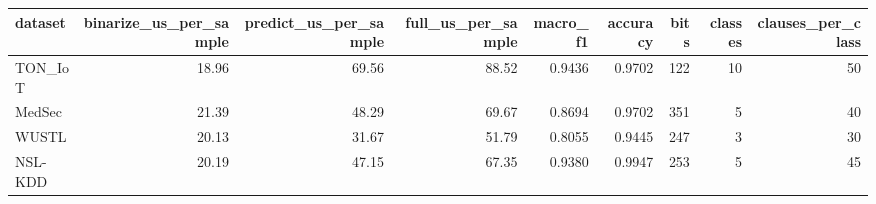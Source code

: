 \begin{tabular}{lrrrrrrrr}
\toprule
dataset & binarize\_us\_per\_sample & predict\_us\_per\_sample & full\_us\_per\_sample & macro\_f1 & accuracy & bits & classes & clauses\_per\_class \\
\midrule
TON\_IoT & 18.96 & 69.56 & 88.52 & 0.9436 & 0.9702 & 122 & 10 & 50 \\
MedSec & 21.39 & 48.29 & 69.67 & 0.8694 & 0.9702 & 351 & 5 & 40 \\
WUSTL & 20.13 & 31.67 & 51.79 & 0.8055 & 0.9445 & 247 & 3 & 30 \\
NSL-KDD & 20.19 & 47.15 & 67.35 & 0.9380 & 0.9947 & 253 & 5 & 45 \\
\bottomrule
\end{tabular}
